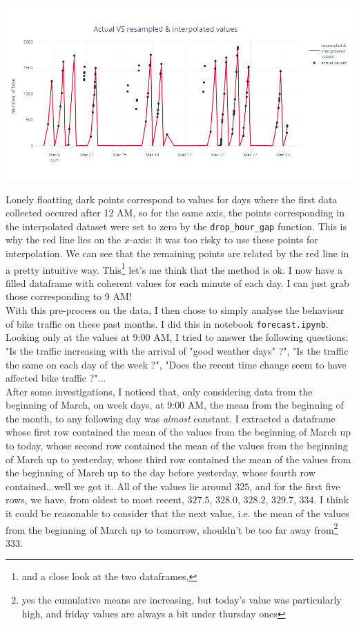 \documentclass[11pt,a4paper]{article}
\begin{document}
\begin{center}
\includegraphics[scale=0.35]{resamp_interp.png}
\end{center}


Lonely floatting dark points correspond to values for days where the first data collected occured after 12 AM, so for the same axis, the points corresponding in the interpolated dataset were set to zero by the \texttt{drop\_hour\_gap} function. This is why the red line lies on the $x$-axis: it was too risky to use these points for interpolation. We can see that the remaining points are related by the red line in a pretty intuitive way. This\footnote{and a close look at the two dataframes,} let's me think that the method is ok. I now have a filled dataframe with coherent values for each minute of each day. I can just grab those corresponding to 9 AM!\\

With this pre-process on the data, I then chose to simply analyse the behaviour of bike traffic on these past months. I did this in notebook \texttt{forecast.ipynb}. Looking only at the values at 9:00 AM, I tried to answer the following questions: "Is the traffic increasing with the arrival of "good weather days" ?", "Is the traffic the same on each day of the week ?", "Does the recent time change seem to have affected bike traffic ?"...\\

After some investigations, I noticed that, only considering data from the beginning of March, on week days, at 9:00 AM, the mean from the beginning of the month, to any following day was \textit{almost} constant. I extracted a dataframe whose first row contained the mean of the values from the beginning of March up to today, whose second row contained the mean of the values from the beginning of March up to yesterday, whose third row contained the mean of the values from the beginning of March up to the day before yesterday, whose fourth row contained...well we got it. All of the values lie around $325$, and for the first five rows, we have, from oldest to most recent, $327.5$, $328.0$, $328.2$, $329.7$, $334$. I think it could be reasonable to consider that the next value, i.e. the mean of the values from the beginning of March up to tomorrow, shouldn't be too far away from\footnote{yes the cumulative means are increasing, but today's value was particularly high, and friday values are always a bit under thursday ones} $333$.
\end{document}
